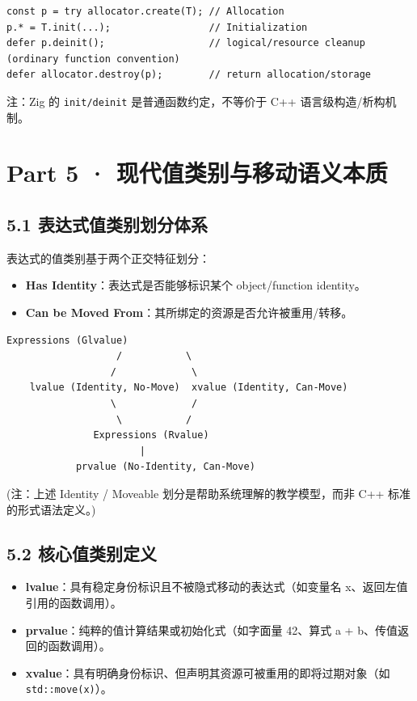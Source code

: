 \documentclass[11pt,a4paper]{article}
\begin{document}
\begin{lstlisting}[language=text]
const p = try allocator.create(T); // Allocation
p.* = T.init(...);                 // Initialization
defer p.deinit();                  // logical/resource cleanup (ordinary function convention)
defer allocator.destroy(p);        // return allocation/storage
\end{lstlisting}
注：Zig 的 \texttt{init/deinit} 是普通函数约定，不等价于 C++ 语言级构造/析构机制。

\section{Part 5 · 现代值类别与移动语义本质}
\subsection{5.1 表达式值类别划分体系}
表达式的值类别基于两个正交特征划分：

\begin{itemize}
  \item \textbf{Has Identity}：表达式是否能够标识某个 object/function identity。
  \item \textbf{Can be Moved From}：其所绑定的资源是否允许被重用/转移。
\end{itemize}
\begin{lstlisting}[language=text]
               Expressions (Glvalue)
                   /           \
                  /             \
    lvalue (Identity, No-Move)  xvalue (Identity, Can-Move)
                  \             /
                   \           /
               Expressions (Rvalue)
                       |
            prvalue (No-Identity, Can-Move)
\end{lstlisting}
(注：上述 Identity / Moveable 划分是帮助系统理解的教学模型，而非 C++ 标准的形式语法定义。)

\subsection{5.2 核心值类别定义}
\begin{itemize}
  \item \textbf{lvalue}：具有稳定身份标识且不被隐式移动的表达式（如变量名 x、返回左值引用的函数调用）。
  \item \textbf{prvalue}：纯粹的值计算结果或初始化式（如字面量 42、算式 a + b、传值返回的函数调用）。
  \item \textbf{xvalue}：具有明确身份标识、但声明其资源可被重用的即将过期对象（如 \texttt{std::move(x)}）。
\end{itemize}
\end{document}
